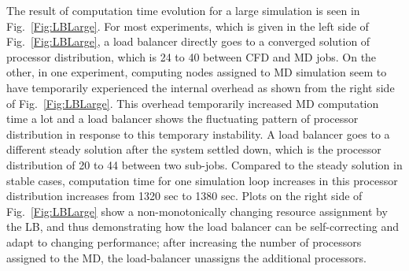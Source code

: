 \documentclass[conference,final]{IEEEtran}
\begin{document}
The result of computation time evolution for a large simulation is
seen in Fig.~\ref{Fig:LBLarge}. For most experiments, which is given in
the left side of Fig.~\ref{Fig:LBLarge}, a load balancer directly goes
to a converged solution of processor distribution, which is 24 to 40
between CFD and MD jobs. On the other, in one experiment, computing
nodes assigned to MD simulation seem to have temporarily experienced
the internal overhead as shown from the right side of
Fig.~\ref{Fig:LBLarge}. This overhead temporarily increased MD
computation time a lot and a load balancer shows the fluctuating
pattern of processor distribution in response to this temporary
instability. A load balancer goes to a different steady solution after
the system settled down, which is the processor distribution of 20 to
44 between two sub-jobs. Compared to the steady solution in stable
cases, computation time for one simulation loop increases in this
processor distribution increases from 1320 sec to 1380
sec. %
Plots on the right side of Fig.~\ref{Fig:LBLarge} show a
non-monotonically changing resource assignment by the LB, and thus
demonstrating how the load balancer can be self-correcting and adapt
to changing performance; after increasing the number of processors
assigned to the MD, the load-balancer unassigns the additional
processors.
\end{document}
